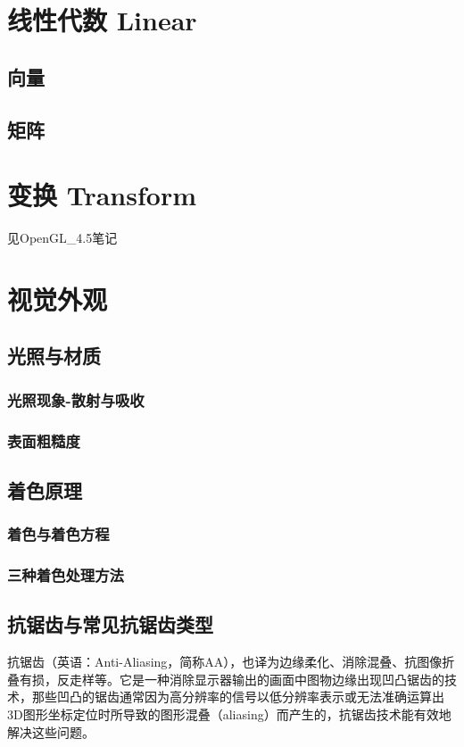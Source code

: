 \documentclass[UTF8,a4paper,12pt]{ctexbook}
\begin{document}
\chapter{线性代数 Linear}
	\section{向量}
	
	\section{矩阵}


		
\chapter{变换 Transform}
	见OpenGL\_4.5笔记


\chapter{视觉外观}
	\section{光照与材质}
		\subsection{光照现象-散射与吸收}
		
		\subsection{表面粗糙度}
		
	\section{着色原理}
		\subsection{着色与着色方程}
		
		\subsection{三种着色处理方法}
		
		
	\section{抗锯齿与常见抗锯齿类型}
		抗锯齿（英语：Anti-Aliasing，简称AA），也译为边缘柔化、消除混叠、抗图像折叠有损，反走样等。它是一种消除显示器输出的画面中图物边缘出现凹凸锯齿的技术，那些凹凸的锯齿通常因为高分辨率的信号以低分辨率表示或无法准确运算出3D图形坐标定位时所导致的图形混叠（aliasing）而产生的，抗锯齿技术能有效地解决这些问题。
		
\end{document}

